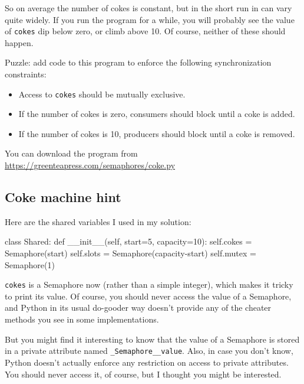 \documentclass{book}
\begin{document}
So on average the number of cokes is constant, but in the short
run in can vary quite widely.  If you run the program for a
while, you will probably see the value of {\tt cokes} dip
below zero, or climb above 10.  Of course, neither of these
should happen.

Puzzle: add code to this program to enforce the following
synchronization constraints:

\begin{itemize}

    \item Access to {\tt cokes} should be mutually exclusive.

    \item If the number of cokes is zero, consumers should block
          until a coke is added.

    \item If the number of cokes is 10, producers should block
          until a coke is removed.

\end{itemize}

You can download the program from
\url{https://greenteapress.com/semaphores/coke.py}



\subsection {Coke machine hint}

Here are the shared variables I used in my solution:

\begin{unbreakable}[]{}
class Shared:
 def __init__(self, start=5, capacity=10):
  self.cokes = Semaphore(start)
  self.slots = Semaphore(capacity-start)
  self.mutex = Semaphore(1)
\end{unbreakable}

{\tt cokes} is a Semaphore now (rather than a simple integer),
which makes it tricky to print its value.  Of course, you
should never access the value of a Semaphore, and Python in
its usual do-gooder way doesn't provide any of the cheater
methods you see in some implementations.

But you might find it interesting to know that the value
of a Semaphore is stored in a private attribute named
    {\tt \_Semaphore\_\_value}.  Also, in case you don't know,
Python doesn't actually enforce any restriction on access to
private attributes.  You should never access it, of course,
but I thought you might be interested.
\end{document}
